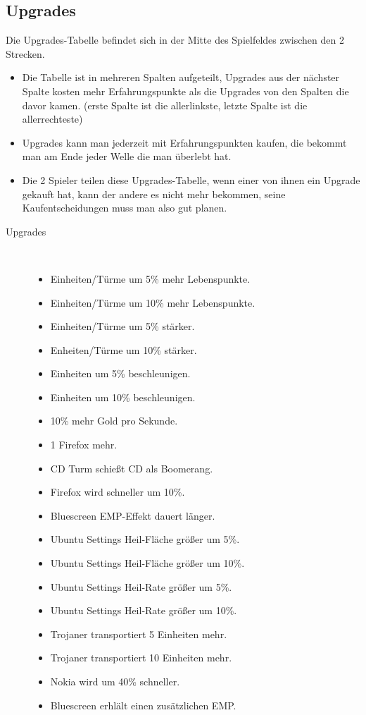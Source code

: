 \subsection{Upgrades}
Die Upgrades-Tabelle befindet sich in der Mitte des Spielfeldes zwischen den 2 Strecken. 
\begin{itemize}
\item Die Tabelle ist in mehreren Spalten aufgeteilt, Upgrades aus der nächster Spalte kosten mehr Erfahrungspunkte als die Upgrades von den
Spalten die davor kamen. (erste Spalte ist die allerlinkste, letzte Spalte ist die allerrechteste)
\item Upgrades kann man jederzeit mit Erfahrungspunkten kaufen, die bekommt man am Ende jeder Welle die man überlebt hat.
\item Die 2 Spieler teilen diese Upgrades-Tabelle, wenn einer von ihnen ein Upgrade gekauft hat, kann der
andere es nicht mehr bekommen, seine Kaufentscheidungen muss man also gut planen.
\end{itemize}

\begin{description}
\item[Upgrades]
~\\
\begin{itemize}
	\item Einheiten/Türme um 5\% mehr Lebenspunkte.
	\item Einheiten/Türme um 10\% mehr Lebenspunkte.
	\item Einheiten/Türme um 5\% stärker.
	\item Enheiten/Türme um 10\% stärker.
	\item Einheiten um 5\% beschleunigen.
	\item Einheiten um 10\% beschleunigen.
	\item 10\% mehr Gold pro Sekunde.
	\item 1 Firefox mehr.
	\item CD Turm schießt CD als Boomerang.
	\item Firefox wird schneller um 10\%.
	\item Bluescreen EMP-Effekt dauert länger.
	\item Ubuntu Settings Heil-Fläche größer um 5\%.
	\item Ubuntu Settings Heil-Fläche größer um 10\%.
	\item Ubuntu Settings Heil-Rate größer um 5\%.
	\item Ubuntu Settings Heil-Rate größer um 10\%.
	\item Trojaner transportiert 5 Einheiten mehr.
	\item Trojaner transportiert 10 Einheiten mehr.
	\item Nokia wird um 40\% schneller.
	\item Bluescreen erhlält einen zusätzlichen EMP.
\end{itemize}
\end{description}
